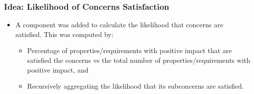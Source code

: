 \documentclass{beamer}
\begin{document}
\begin{frame}[fragile]
	\frametitle{Idea: Likelihood of Concerns Satisfaction}
	\begin{itemize}
		\item A component was added to calculate the likelihood that concerns are satisfied. This was computed by:
		\begin{itemize}
			\item Percentage of properties/requirements with positive impact that are satisfied the concerns vs the total number of properties/requirements with positive impact, and
			\item Recursively aggregating the likelihood that its subconcerns are satisfied.
		\end{itemize}	
	\end{itemize}
\end{frame}
\end{document}
